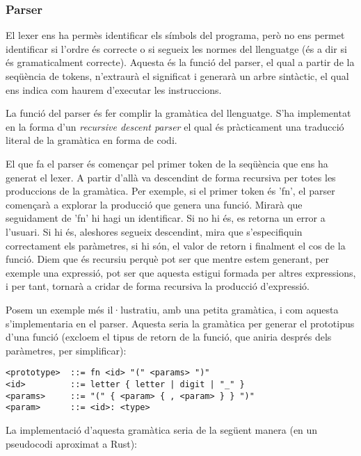 ﻿\documentclass{article}
\begin{document}
\subsubsection{Parser}

El lexer ens ha permès identificar els símbols del programa, però no ens permet
identificar si l'ordre és correcte o si segueix les normes del llenguatge (és a
dir si és gramaticalment correcte). Aquesta és la funció del parser, el qual a
partir de la seqüència de tokens, n'extraurà el significat i generarà un arbre
sintàctic, el qual ens indica com haurem d'executar les instruccions.

La funció del parser és fer complir la gramàtica del llenguatge. S'ha
implementat en la forma d'un \textit{recursive descent parser} el qual és
pràcticament una traducció literal de la gramàtica en forma de codi.

El que fa el parser és començar pel primer token de la seqüència que ens ha
generat el lexer. A partir d'allà va descendint de forma recursiva per totes les
produccions de la gramàtica. Per exemple, si el primer token és 'fn', el parser
començarà a explorar la producció que genera una funció. Mirarà que seguidament
de 'fn' hi hagi un identificar. Si no hi és, es retorna un error a l'usuari. Si
hi és, aleshores segueix descendint, mira que s'especifiquin correctament els
paràmetres, si hi són, el valor de retorn i finalment el cos de la funció. Diem
que és recursiu perquè pot ser que mentre estem generant, per exemple una
expressió, pot ser que aquesta estigui formada per altres expressions, i per
tant, tornarà a cridar de forma recursiva la producció d'expressió.

Posem un exemple més il·lustratiu, amb una petita gramàtica, i com aquesta
s'implementaria en el parser. Aquesta seria la gramàtica per generar el
prototipus d'una funció (excloem el tipus de retorn de la funció, que aniria
després dels paràmetres, per simplificar):

\begin{verbatim}
<prototype>  ::= fn <id> "(" <params> ")"
<id>         ::= letter { letter | digit | "_" }
<params>     ::= "(" { <param> { , <param> } } ")"
<param>      ::= <id>: <type>
\end{verbatim}

La implementació d'aquesta gramàtica seria de la següent manera (en un
pseudocodi aproximat a Rust):
\end{document}
